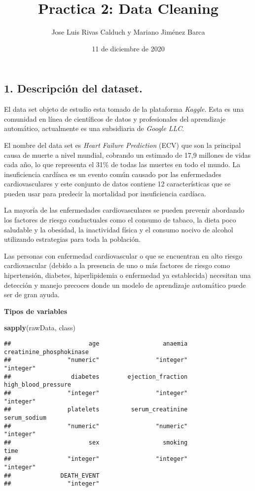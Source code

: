 \documentclass[
]{article}
\title{Practica 2: Data Cleaning}
\author{Jose Luis Rivas Calduch y Mariano Jiménez Barca}
\date{11 de diciembre de 2020}
\newenvironment{Shaded}{\begin{snugshade}}{\end{snugshade}}
\newcommand{\KeywordTok}[1]{\textcolor[rgb]{0.13,0.29,0.53}{\textbf{#1}}}
\newcommand{\NormalTok}[1]{#1}
\begin{document}
\maketitle

{
\setcounter{tocdepth}{3}
\tableofcontents
}
\hypertarget{descripciuxf3n-del-dataset.}{%
\subsection{1. Descripción del
dataset.}\label{descripciuxf3n-del-dataset.}}

El data set objeto de estudio esta tomado de la plataforma
\emph{Kaggle}. Esta es una comunidad en línea de científicos de datos y
profesionales del aprendizaje automático, actualmente es una subsidiaria
de \emph{Google LLC}.

El nombre del data set es \emph{Heart Failure Prediction} (ECV) que son
la principal causa de muerte a nivel mundial, cobrando un estimado de
17,9 millones de vidas cada año, lo que representa el 31\% de todas las
muertes en todo el mundo. La insuficiencia cardíaca es un evento común
causado por las enfermedades cardiovasculares y este conjunto de datos
contiene 12 características que se pueden usar para predecir la
mortalidad por insuficiencia cardíaca.

La mayoría de las enfermedades cardiovasculares se pueden prevenir
abordando los factores de riesgo conductuales como el consumo de tabaco,
la dieta poco saludable y la obesidad, la inactividad física y el
consumo nocivo de alcohol utilizando estrategias para toda la población.

Las personas con enfermedad cardiovascular o que se encuentran en alto
riesgo cardiovascular (debido a la presencia de uno o más factores de
riesgo como hipertensión, diabetes, hiperlipidemia o enfermedad ya
establecida) necesitan una detección y manejo precoces donde un modelo
de aprendizaje automático puede ser de gran ayuda.

\textbf{Tipos de variables}

\begin{Shaded}
\begin{Highlighting}[]
\KeywordTok{sapply}\NormalTok{(rawData, class)}
\end{Highlighting}
\end{Shaded}

\begin{verbatim}
##                      age                  anaemia creatinine_phosphokinase 
##                "numeric"                "integer"                "integer" 
##                 diabetes        ejection_fraction      high_blood_pressure 
##                "integer"                "integer"                "integer" 
##                platelets         serum_creatinine             serum_sodium 
##                "numeric"                "numeric"                "integer" 
##                      sex                  smoking                     time 
##                "integer"                "integer"                "integer" 
##              DEATH_EVENT 
##                "integer"
\end{verbatim}
\end{document}
